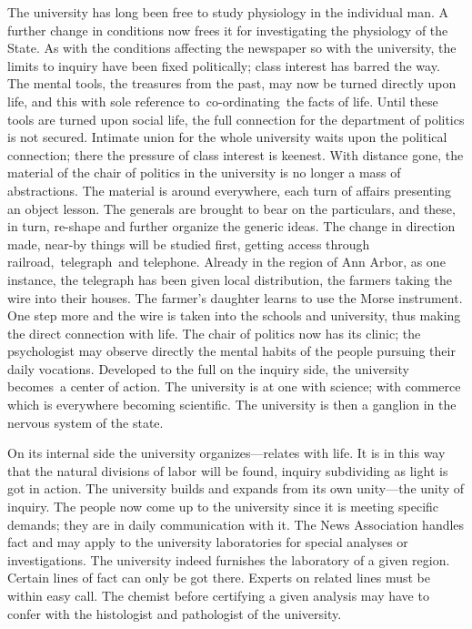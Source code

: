 \documentclass[twoside,symmetric,nobib,justified]{tufte-book}
\begin{document}
The university has long been free to study physiology in the individual
man. A further change in conditions now frees it for investigating the
physiology of the State. As with the conditions affecting the newspaper
so with the university, the limits to inquiry have been fixed
politically; class interest has barred the way. The mental tools, the
treasures from the past, may now be turned directly upon life, and this
with sole reference to~co-ordinating~the facts of life. Until these
tools are turned upon social life, the full connection for the
department of politics is not secured. Intimate union for the whole
university waits upon the political connection; there the pressure of
class interest is keenest. With distance gone, the material of the chair
of politics in the university is no longer a mass of abstractions. The
material is around everywhere, each turn of affairs presenting an object
lesson. The generals are brought to bear on the particulars, and these,
in turn, re-shape and further organize the generic ideas. The change in
direction made, near-by things will be studied first, getting access
through railroad,~telegraph~and telephone. Already in the region of Ann
Arbor, as one instance, the telegraph has been given local distribution,
the farmers taking the wire into their houses. The farmer's daughter
learns to use the Morse instrument. One step more and the wire is taken
into the schools and university, thus making the direct connection with
life. The chair of politics now has its clinic; the psychologist may
observe directly the mental habits of the people pursuing their daily
vocations. Developed to the full on the inquiry side, the university
becomes~a center of action. The university is at one with science; with
commerce which is everywhere becoming scientific. The university is then
a ganglion in the nervous system of the state.~

On its internal side the university organizes---relates with life. It is
in this way that the natural divisions of labor will be found, inquiry
subdividing as light is got in action. The university builds and expands
from its own unity---the unity of inquiry. The people now come up to the
university since it is meeting specific demands; they are in daily
communication with it. The News Association handles fact and may apply
to the university laboratories for special analyses or investigations.
The university indeed furnishes the laboratory of a given region.
Certain lines of fact can only be got there. Experts on related lines
must be within easy call. The chemist before certifying a given analysis
may have to confer with the histologist and pathologist of the
university.~
\end{document}

